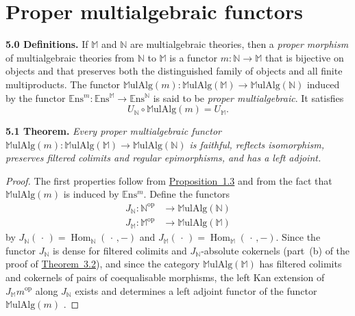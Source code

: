 \documentclass{article}
\newenvironment{itenv}[1]
  {\phantomsection\par\medskip\noindent\textbf{#1.}\itshape}
  {\medskip}
\newenvironment{rmenv}[1]
  {\phantomsection\par\medskip\noindent\textbf{#1.}\rmfamily}
  {\medskip}
\newcommand{\bb}[1]{{\mathbb{#1}}}
\newcommand{\op}{{\mathrm{op}}}
\newcommand{\Set}{\mathbb{E}\mathrm{ns}}
\newcommand{\MulAlg}{\mathbb{M}\mathrm{ulAlg}}
\DeclareMathOperator{\Hom}{Hom}
\newcommand{\oldpage}[1]{\marginpar{\footnotesize$\Big\vert$ \textit{p.~#1}}}
\begin{document}
\section{Proper multialgebraic functors}
\label{5}

\begin{rmenv}{5.0 Definitions}
\label{5.0}
  If $\bb{M}$ and $\bb{N}$ are multialgebraic theories, then a \emph{proper morphism} of multialgebraic theories from $\bb{N}$ to $\bb{M}$ is a functor $m\colon\bb{N}\to\bb{M}$ that is bijective on objects and that preserves both the distinguished family of objects and all finite multiproducts.
  The functor $\MulAlg(m)\colon\MulAlg(\bb{M})\to\MulAlg(\bb{N})$ induced by the
\oldpage{206}
  functor $\Set^m\colon\Set^\bb{M}\to\Set^\bb{N}$ is said to be \emph{proper multialgebraic}.
  It satisfies
  \[
    U_\bb{N}\circ\MulAlg(m) = U_\bb{M}.
  \]
\end{rmenv}

\begin{itenv}{5.1 Theorem}
\label{5.1}
  Every proper multialgebraic functor $\MulAlg(m)\colon\MulAlg(\bb{M})\to\MulAlg(\bb{N})$ is faithful, reflects isomorphism, preserves filtered colimits and regular epimorphisms, and has a left adjoint.
\end{itenv}

\begin{proof}
  The first properties follow from \hyperref[1.3]{Proposition~1.3} and from the fact that $\MulAlg(m)$ is induced by $\Set^m$.
  Define the functors
  \[
    \begin{aligned}
      J_\bb{N}\colon \bb{N}^\op &\to \MulAlg(\bb{N})
    \\J_\bb{M}\colon \bb{M}^\op &\to \MulAlg(\bb{M})
    \end{aligned}
  \]
  by $J_\bb{N}(\,\cdot\,)=\Hom_\bb{N}(\,\cdot\,,-)$ and $J_\bb{M}(\,\cdot\,)=\Hom_\bb{M}(\,\cdot\,,-)$.
  Since the functor $J_\bb{N}$ is dense for filtered colimits and $J_\bb{N}$-absolute cokernels (part~(b) of the proof of \hyperref[3.2]{Theorem~3.2}), and since the category $\MulAlg(\bb{M})$ has filtered colimits and cokernels of pairs of coequalisable morphisms, the left Kan extension of $J_\bb{M}m^\op$ along $J_\bb{N}$ exists and determines a left adjoint functor of the functor $\MulAlg(m)$ \cite[Prop.~3.1]{4}.
\end{proof}
\end{document}
